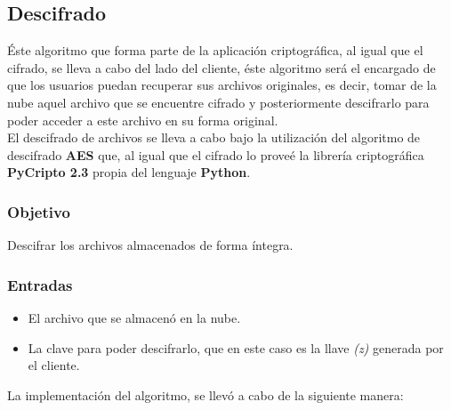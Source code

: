 \subsection{Descifrado}
Éste algoritmo que forma parte de la aplicación criptográfica, al igual que el cifrado, se lleva a cabo del lado del cliente, éste algoritmo será el encargado de que los usuarios puedan recuperar sus archivos originales, es decir, tomar de la nube aquel archivo que se encuentre cifrado y posteriormente descifrarlo para poder acceder a este archivo en su forma original. \\
El descifrado de archivos se lleva a cabo bajo la utilización del algoritmo de descifrado \textbf{AES} que, al igual que el cifrado lo proveé la librería criptográfica \textbf{PyCripto 2.3} propia del lenguaje \textbf{Python}.   \\ 

\subsubsection{Objetivo}
Descifrar los archivos almacenados de forma íntegra.

\subsubsection{Entradas}
	\begin{itemize}
		\item El archivo que se almacenó en la nube.
		\item La clave para poder descifrarlo, que en este caso es la llave \textit{(z)} generada por el cliente.
	\end{itemize}

La implementación del algoritmo, se llevó a cabo de la siguiente manera: 

